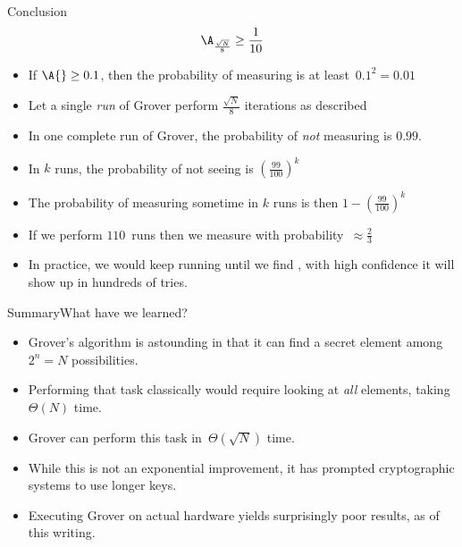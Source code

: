 \begin{Grover}
\begin{frame}{Conclusion}
\Vskip{-3em}\[ \A_{\frac{\sqrt{N}}{8}}\geq  \frac{1}{10} \]
\begin{itemize}
    \item If $\A{} \geq 0.1$, then the probability of measuring \W{} is at least~$0.1^{2}=0.01$
    \item Let a single \emph{run} of Grover perform $\frac{\sqrt{N}}{8}$ iterations as described
    \item In one complete run of Grover, the probability of \emph{not} measuring \W{} is $0.99$.
    \item In $k$ runs, the probability of not seeing \W{} is $\left(\frac{99}{100}\right)^{k}$
    \item The probability of measuring \W{} sometime in $k$ runs is then \( 1-\left(\frac{99}{100}\right)^{k} \)
    \item If we perform $110$~runs then we measure \W{} with probability~$\approx\frac{2}{3}$
    \item In practice, we would keep running until we find \W{}, with high confidence it will show up in hundreds of tries.
\end{itemize}
\end{frame}
\end{Grover}

\begin{frame}{Summary}{What have we learned?}

\begin{itemize}
    \item Grover's algorithm is astounding in that it can find a secret element among $2^{n}=N$ possibilities.
    \item Performing that task classically would require looking at \emph{all} elements, taking~$\Theta(N)$ time.
    \item Grover can perform this task in~$\Theta(\sqrt{N})$ time.
    \item While this is not an exponential improvement, it has prompted cryptographic systems to use longer keys.
    \item Executing Grover on actual hardware yields surprisingly poor results, as of this writing.
\end{itemize}
\end{frame}
